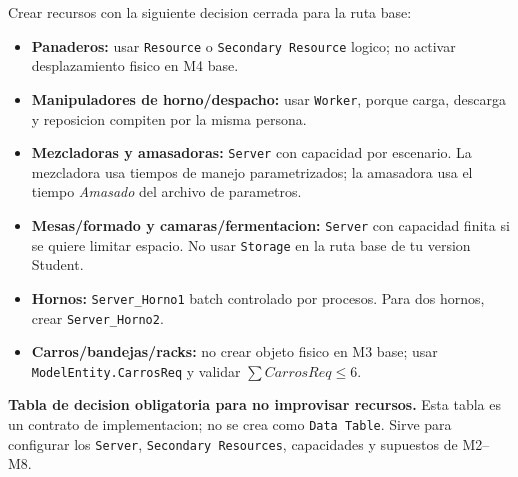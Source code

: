 \documentclass[11pt]{article}
\newcommand{\simio}[1]{\texttt{#1}}
\newcommand{\state}[1]{\texttt{#1}}
\begin{document}
Crear recursos con la siguiente decision cerrada para la ruta base:
\begin{itemize}
  \item \textbf{Panaderos:} usar \simio{Resource} o \simio{Secondary Resource} logico; no activar desplazamiento fisico en M4 base.
  \item \textbf{Manipuladores de horno/despacho:} usar \simio{Worker}, porque carga, descarga y reposicion compiten por la misma persona.
  \item \textbf{Mezcladoras y amasadoras:} \simio{Server} con capacidad por escenario. La mezcladora usa tiempos de manejo parametrizados; la amasadora usa el tiempo \textit{Amasado} del archivo de parametros.
  \item \textbf{Mesas/formado y camaras/fermentacion:} \simio{Server} con capacidad finita si se quiere limitar espacio. No usar \simio{Storage} en la ruta base de tu version Student.
  \item \textbf{Hornos:} \simio{Server\_Horno1} batch controlado por procesos. Para dos hornos, crear \simio{Server\_Horno2}.
  \item \textbf{Carros/bandejas/racks:} no crear objeto fisico en M3 base; usar \state{ModelEntity.CarrosReq} y validar \(\sum CarrosReq \le 6\).
\end{itemize}

\textbf{Tabla de decision obligatoria para no improvisar recursos.} Esta tabla es un contrato de implementacion; no se crea como \simio{Data Table}. Sirve para configurar los \simio{Server}, \simio{Secondary Resources}, capacidades y supuestos de M2--M8.
\end{document}

